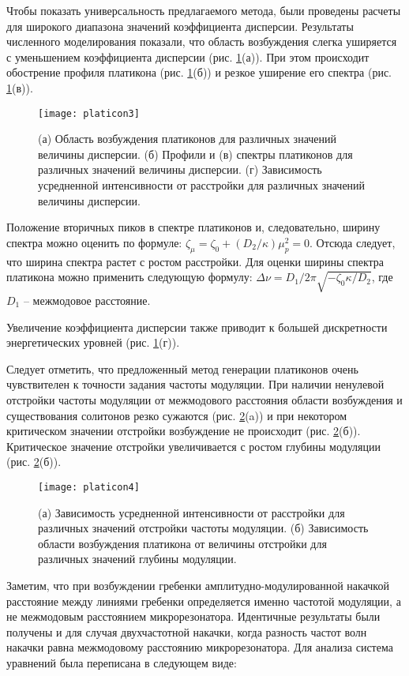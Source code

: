 Чтобы показать универсальность предлагаемого метода, были проведены расчеты для широкого диапазона значений коэффициента дисперсии. Результаты численного моделирования показали, что область возбуждения слегка уширяется с уменьшением коэффициента дисперсии (рис. \ref{platicon3}(а)). При этом происходит обострение профиля платикона (рис. \ref{platicon3}(б)) и резкое уширение его спектра (рис. \ref{platicon3}(в)).

\begin{figure}
  \centering
  \texttt{[image: platicon3]}
  \caption{(а) Область возбуждения платиконов для различных значений величины дисперсии. (б) Профили и (в) спектры платиконов для различных значений величины дисперсии. (г) Зависимость усредненной интенсивности от расстройки для различных значений величины дисперсии.} \label{platicon3}
\end{figure}

Положение вторичных пиков в спектре платиконов и, следовательно, ширину спектра можно оценить по формуле: $\zeta_\mu=\zeta_0+(D_2/\kappa)\mu^2_p=0$. Отсюда следует, что ширина спектра растет с ростом расстройки. Для оценки ширины спектра платикона можно применить следующую формулу: $\Delta\nu=D_1/2\pi\sqrt{-\zeta_0\kappa/D_2}$, где $D_1$ – межмодовое расстояние.

Увеличение коэффициента дисперсии также приводит к большей дискретности энергетических уровней (рис. \ref{platicon3}(г)).

Следует отметить, что предложенный метод генерации платиконов очень чувствителен к точности задания частоты модуляции. При наличии ненулевой отстройки частоты модуляции от межмодового расстояния области возбуждения и существования солитонов резко сужаются (рис. \ref{platicon4}(a)) и при некотором критическом значении отстройки возбуждение не происходит (рис. \ref{platicon4}(б)). Критическое значение отстройки увеличивается с ростом глубины модуляции (рис. \ref{platicon4}(б)).

\begin{figure}
  \centering
  \texttt{[image: platicon4]}
  \caption{(а) Зависимость усредненной интенсивности от расстройки для различных значений отстройки частоты модуляции. (б) Зависимость области возбуждения платикона от величины отстройки для различных значений глубины модуляции.} \label{platicon4}
\end{figure}

Заметим, что при возбуждении гребенки амплитудно-модулированной накачкой расстояние между линиями гребенки определяется именно частотой модуляции, а не межмодовым расстоянием микрорезонатора.
Идентичные результаты были получены и для случая двухчастотной накачки, когда разность частот волн накачки равна межмодовому расстоянию микрорезонатора. Для анализа система уравнений была переписана в следующем виде:

